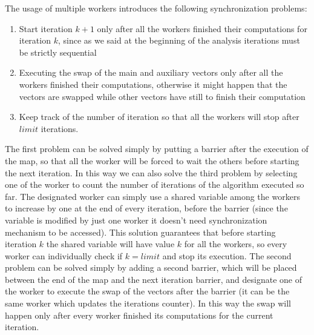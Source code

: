 \documentclass{article}
\begin{document}
	The usage of multiple workers introduces the following synchronization problems:
	\begin{enumerate}
		\item Start iteration $k+1$ only after all the workers finished their computations for iteration $k$, since as we said at the beginning of the analysis iterations must be strictly sequential 
		\item Executing the swap of the main and auxiliary vectors only after all the workers finished their computations, otherwise it might happen that the vectors are swapped while other vectors have still to finish their computation
		\item Keep track of the number of iteration so that all the workers will stop after $limit$ iterations. 
	\end{enumerate}
	The first problem can be solved simply by putting a barrier after the execution of the map, so that all the worker will be forced to wait the others before starting the next iteration. In this way we can also solve the third problem by selecting one of the worker to count the number of iterations of the algorithm executed so far. The designated worker can simply use a shared variable among the workers to increase by one at the end of every iteration, before the barrier (since the variable is modified by just one worker it doesn't need synchronization mechanism to be accessed). This solution guarantees that before starting iteration $k$ the shared variable will have value $k$ for all the workers, so every worker can individually check if $k = limit$ and stop its execution. The second problem can be solved simply by adding a second barrier, which will be placed between the end of the map and the next iteration barrier, and designate one of the worker to execute the swap of the vectors after the barrier (it can be the same worker which updates the iterations counter). In this way the swap will happen only after every worker finished its computations for the current iteration. 
	
\end{document}
